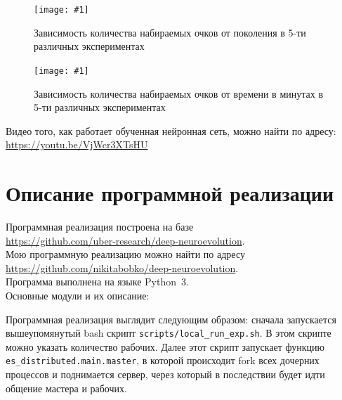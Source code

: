 \documentclass[12pt]{article}
\newcommand{\img}[3]{
    \begin{figure}[H]
        \centering
        \texttt{[image: \#1]}
        \caption{#3}
    \end{figure}
}
\begin{document}
    \img{score_plot.png}{1.0}{Зависимость количества набираемых очков от поколения в 5-ти различных экспериментах}

    \img{score_plot_per_time.png}{1.0}{Зависимость количества набираемых очков от времени в минутах в 5-ти различных экспериментах}

    Видео того, как работает обученная нейронная сеть, можно найти по адресу: \\
    \url{https://youtu.be/VjWcr3XTsHU}

\section{Описание программной реализации}
    Программная реализация построена на базе \\
    \url{https://github.com/uber-research/deep-neuroevolution}. \\
    Мою программную реализацию можно найти по адресу \\
    \url{https://github.com/nikitabobko/deep-neuroevolution}. \\
    Программа выполнена на языке Python~3.\\

    Основные модули и их описание:

    Программная реализация выглядит следующим образом: сначала запускается вышеупомянутый bash скрипт \verb!scripts/local_run_exp.sh!. В этом скрипте можно указать количество рабочих. Далее этот скрипт запускает функцию \verb!es_distributed.main.master!, в которой происходит fork всех дочерних процессов и поднимается сервер, через который в последствии будет идти общение мастера и рабочих. \\
\end{document}
